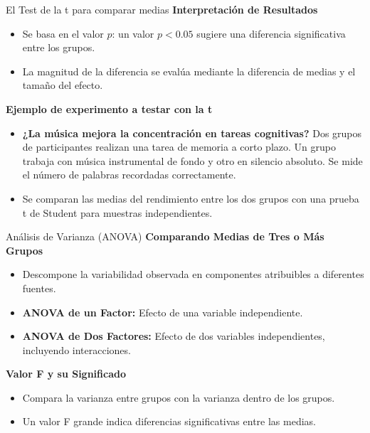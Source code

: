 ﻿\documentclass{beamer}
\begin{document}
\begin{frame}{El Test de la t para comparar medias}
    \textbf{Interpretación de Resultados}
    \begin{itemize}
        \item Se basa en el valor \(p\): un valor \(p < 0.05\) sugiere una diferencia significativa entre los grupos.
        \item La magnitud de la diferencia se evalúa mediante la diferencia de medias y el tamaño del efecto.
    \end{itemize}
    \textbf{Ejemplo de experimento a testar con la t}
    \begin{itemize}
        \item \textbf{¿La música mejora la concentración en tareas cognitivas?} Dos grupos de participantes realizan una tarea de memoria a corto plazo. Un grupo trabaja con música instrumental de fondo y otro en silencio absoluto. Se mide el número de palabras recordadas correctamente.
        \item Se comparan las medias del rendimiento entre los dos grupos con una prueba t de Student para muestras independientes.
    \end{itemize}

\end{frame}

\begin{frame}{Análisis de Varianza (ANOVA)}
    \textbf{Comparando Medias de Tres o Más Grupos}
    \begin{itemize}
        \item Descompone la variabilidad observada en componentes atribuibles a diferentes fuentes.
        \item \textbf{ANOVA de un Factor:} Efecto de una variable independiente.
        \item \textbf{ANOVA de Dos Factores:} Efecto de dos variables independientes, incluyendo interacciones.
    \end{itemize}

    \textbf{Valor F y su Significado}
    \begin{itemize}
        \item Compara la varianza entre grupos con la varianza dentro de los grupos.
        \item Un valor F grande indica diferencias significativas entre las medias.
    \end{itemize}
\end{frame}
\end{document}
